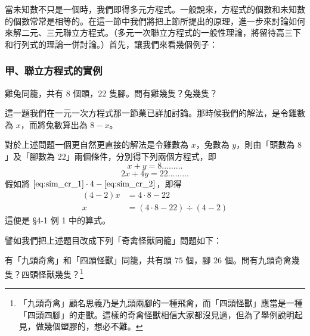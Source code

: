 當未知數不只是一個時，我們即得多元方程式。一般說來，方程式的個數和未知數的個數常常是相等的。在這一節中我們將把上節所提出的原理，進一步來討論如何來解二元、三元聯立方程式。（多元一次聯立方程式的一般性理論，將留待高三下和行列式的理論一併討論。）首先，讓我們來看幾個例子：

\subsubsection*{甲、聯立方程式的實例}\label{subsec:4-3-a}

\begin{example}\label{ex:4-3-1}
雞兔同籠，共有 $8$ 個頭，$22$ 隻腳。問有雞幾隻？兔幾隻？
\end{example}

這一題我們在一元一次方程式那一節業已詳加討論。那時候我們的解法，是令雞數為 $x$，而將兔數算出為 $8-x$。

對於上述問題一個更自然更直接的解法是令雞數為 $x$，兔數為 $y$，則由「頭數為 $8$」及「腳數為 $22$」兩個條件，分別得下列兩個方程式，即
\begin{equation}\label{eq:sim_cr_1}
  x+y = 8 \dots\dots\dots
\end{equation}
\begin{equation}\label{eq:sim_cr_2}
  2x+4y = 22 \dots\dots\dots
\end{equation}
假如將 $\eqref{eq:sim_cr_1} \cdot 4 - \eqref{eq:sim_cr_2}$，即得
\begin{align*}
  (4-2)x &= 4 \cdot 8 - 22 \\
  x &= (4 \cdot 8 - 22) \div (4-2)
\end{align*}
這便是 \S 4-1 例 1 中的算式。

譬如我們把上述題目改成下列「奇禽怪獸同籠」問題如下：

\begin{example}\label{ex:4-3-2}
有「九頭奇禽」和「四頭怪獸」同籠，共有頭 $75$ 個，腳 $26$ 個。問有九頭奇禽幾隻？四頭怪獸幾隻？\footnote{「九頭奇禽」顧名思義乃是九頭兩腳的一種飛禽，而「四頭怪獸」應當是一種「四頭四腳」的走獸。這樣的奇禽怪獸相信大家都沒見過，但為了舉例說明起見，做幾個塑膠的，想必不難。}
\end{example}

